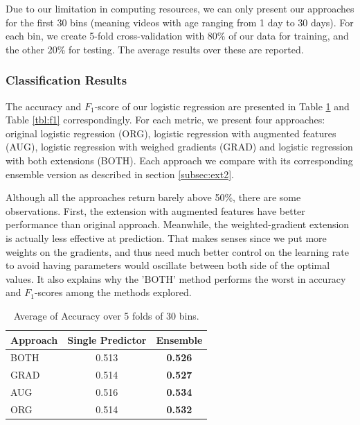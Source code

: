 Due to our limitation in computing resources, we can only present our approaches for the first 30 bins (meaning videos with age ranging from 1 day to 30 days). For each bin, we create 5-fold cross-validation with 80\% of our data for training, and the other 20\% for testing. The average results over these are reported.


\subsubsection{Classification Results}
	The accuracy and $F_1$-score of our logistic regression are presented in Table \ref{tbl:acc} and Table \ref{tbl:f1} correspondingly. For each metric, we present four approaches: original logistic regression (ORG), logistic regression with augmented features (AUG), logistic regression with weighed gradients (GRAD) and logistic regression with both extensions (BOTH). Each approach we compare with its corresponding ensemble version as described in section \ref{subsec:ext2}. 
	
	Although all the approaches return barely above 50\%, there are some observations. First, the extension with augmented features have better performance than original approach. Meanwhile, the weighted-gradient extension is actually less effective at prediction.  That makes senses since we put more weights on the gradients, and thus need much better control on the learning rate to avoid having parameters would oscillate between both side of the optimal values. It also explains why the 'BOTH' method performs the worst in accuracy and $F_1$-scores among the methods explored.
	
	\begin{table}[h]
	\caption{Average of Accuracy over 5 folds of 30 bins.}
	\label{tbl:acc}
		\begin{center}
			\begin{tabular}{| l | c | c |}						
			\hline
			Approach & Single Predictor & Ensemble \\ \hline
			BOTH & 0.513 & \textbf{0.526} \\ \hline
			GRAD & 0.514 & \textbf{0.527} \\ \hline
			AUG & 0.516 & \textbf{0.534} \\ \hline
			ORG & 0.514 & \textbf{0.532} \\ \hline		
			\end{tabular}
		\end{center}	
	\end{table}

